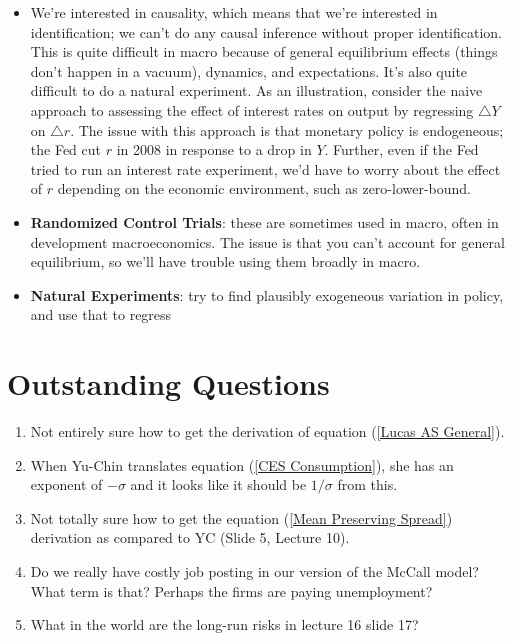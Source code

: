 \documentclass[12pt]{article}
\begin{document}
\begin{itemize}
    \item We're interested in causality, which means that we're interested in identification; we can't do any causal inference without proper identification. This is quite difficult in macro because of general equilibrium effects (things don't happen in a vacuum), dynamics, and expectations. It's also quite difficult to do a natural experiment. As an illustration, consider the naive approach to assessing the effect of interest rates on output by regressing $\triangle Y$ on $\triangle r$. The issue with this approach is that monetary policy is endogeneous; the Fed cut $r$ in 2008 in response to a drop in $Y$. Further, even if the Fed tried to run an interest rate experiment, we'd have to worry about the effect of $r$ depending on the economic environment, such as zero-lower-bound.
    \item \textbf{Randomized Control Trials}: these are sometimes used in macro, often in development macroeconomics. The issue is that you can't account for general equilibrium, so we'll have trouble using them broadly in macro.
    \item \textbf{Natural Experiments}: try to find plausibly exogeneous variation in policy, and use that to regress
\end{itemize}

\section{Outstanding Questions}

\begin{enumerate}
    \item Not entirely sure how to get the derivation of equation (\ref{Lucas AS General}).
    \item When Yu-Chin translates equation (\ref{CES Consumption}), she has an exponent of $-\sigma$ and it looks like it should be $1/\sigma$ from this.
    \item Not totally sure how to get the equation (\ref{Mean Preserving Spread}) derivation as compared to YC (Slide 5, Lecture 10).
    \item Do we really have costly job posting in our version of the McCall model? What term is that? Perhaps the firms are paying unemployment?
    \item What in the world are the long-run risks in lecture 16 slide 17?
\end{enumerate}
\end{document}
